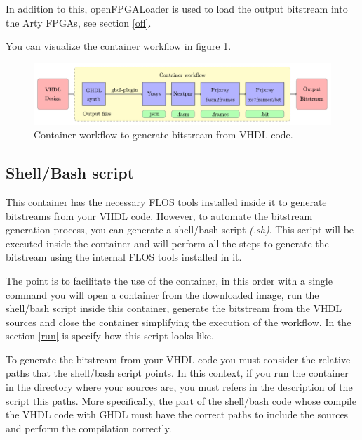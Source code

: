 \noindent In addition to this, openFPGALoader \cite{gh:openFPGALoader} is used to load the output bitstream into the Arty FPGAs, see section \ref{ofl}.

\vspace{5mm}

\noindent You can visualize the container workflow in figure \ref{fig:workf}. 

\begin{figure}[H]
    \centering
    \includegraphics[width=151mm]{figures/container_workflow.pdf}
    \caption{Container workflow to generate bitstream from VHDL code.}
    \label{fig:workf}
\end{figure}

\subsection{Shell/Bash script}

\label{shell:script}

This container has the necessary FLOS tools installed inside it to generate bitstreams from your VHDL code. 
However, to automate the bitstream generation process, you can generate a shell/bash script \textit{(.sh)}.
This script will be executed inside the container and will perform all the steps to generate the bitstream using the internal FLOS tools installed in it.

\vspace{5mm}

\noindent The point is to facilitate the use of the container, in this order with a single command you will open a container from the downloaded image, run the shell/bash script inside this container, generate the bitstream from the VHDL sources and close the container simplifying the execution of the workflow.
In the section \ref{run} is specify how this script looks like.

\vspace{5mm}

\noindent To generate the bitstream from your VHDL code you must consider the relative paths that the shell/bash script points. 
In this context, if you run the container in the directory where your sources are, you must refers in the description of the script this paths.
More specifically, the part of the shell/bash code whose compile the VHDL code with GHDL must have the correct paths to include the sources and perform the compilation correctly.

